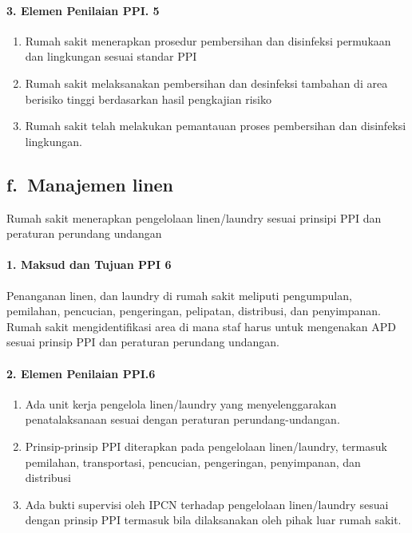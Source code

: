 \documentclass[
]{book}
\providecommand{\tightlist}{%
  \setlength{\itemsep}{0pt}\setlength{\parskip}{0pt}}
\begin{document}
\hypertarget{elemen-penilaian-ppi.-5}{%
\paragraph*{3. Elemen Penilaian PPI. 5}\label{elemen-penilaian-ppi.-5}}

\begin{enumerate}
\def\labelenumi{\alph{enumi}.}
\tightlist
\item
  Rumah sakit menerapkan prosedur pembersihan dan disinfeksi permukaan dan lingkungan sesuai standar PPI
\item
  Rumah sakit melaksanakan pembersihan dan desinfeksi tambahan di area berisiko tinggi berdasarkan hasil pengkajian risiko
\item
  Rumah sakit telah melakukan pemantauan proses pembersihan dan disinfeksi lingkungan.
\end{enumerate}

\hypertarget{f.-manajemen-linen}{%
\subsection*{f.~Manajemen linen}\label{f.-manajemen-linen}}

Rumah sakit menerapkan pengelolaan linen/laundry sesuai prinsipi PPI dan peraturan perundang undangan

\hypertarget{maksud-dan-tujuan-ppi-6}{%
\paragraph*{1. Maksud dan Tujuan PPI 6}\label{maksud-dan-tujuan-ppi-6}}

Penanganan linen, dan laundry di rumah sakit meliputi pengumpulan, pemilahan, pencucian, pengeringan, pelipatan, distribusi, dan penyimpanan. Rumah sakit mengidentifikasi area di mana staf harus untuk mengenakan APD sesuai prinsip PPI dan peraturan perundang undangan.

\hypertarget{elemen-penilaian-ppi.6}{%
\paragraph*{2. Elemen Penilaian PPI.6}\label{elemen-penilaian-ppi.6}}

\begin{enumerate}
\def\labelenumi{\alph{enumi}.}
\tightlist
\item
  Ada unit kerja pengelola linen/laundry yang menyelenggarakan penatalaksanaan sesuai dengan peraturan perundang-undangan.
\item
  Prinsip-prinsip PPI diterapkan pada pengelolaan linen/laundry, termasuk pemilahan, transportasi, pencucian, pengeringan, penyimpanan, dan distribusi
\item
  Ada bukti supervisi oleh IPCN terhadap pengelolaan linen/laundry sesuai dengan prinsip PPI termasuk bila dilaksanakan oleh pihak luar rumah sakit.
\end{enumerate}
\end{document}
